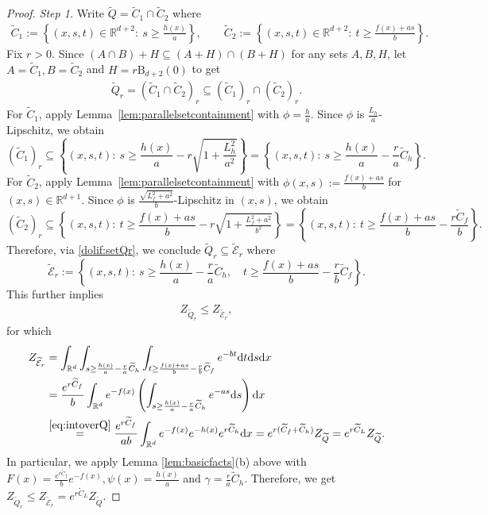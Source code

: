 \documentclass[11pt,letterpaper]{article}
\newcommand{\ball}{\mathrm{B}}
\newcommand{\R}{\mathbb{R}}
\newcommand{\Q}{\widetilde{Q}}
\newcommand{\D}{\mathrm{d}}
\begin{document}
\begin{proof}
\emph{Step 1.}
Write $\Q=\widetilde{C}_1\cap \widetilde{C}_2$ where \begin{align*}
    \widetilde{C}_1:=\left\{(x,s,t)\in\R^{d+2}:\ s\ge \frac{h(x)}a\right\},
\qquad
\widetilde{C}_2:=\left\{(x,s,t)\in\R^{d+2}:\ t\ge \frac{f(x)+as}b\right\}. 
\end{align*}
Fix $r>0$. Since $(A\cap B)+H\subseteq (A+H)\cap(B+H)$ for any sets $A,B,H$, let $A=\widetilde{C}_1,B=\widetilde{C}_2$ and $H=r\ball_{d+2}(0)$ to get
\begin{align}
\label{dolif:setQr}
\Q_r=(\widetilde{C}_1\cap \widetilde{C}_2)_r \subseteq (\widetilde{C}_1)_r\cap (\widetilde{C}_2)_r.
\end{align}
For $\widetilde{C}_1$, apply Lemma~\ref{lem:parallelsetcontainment} with $\phi=\frac{h}{a}$.
Since $\phi$ is $\frac{L_h}{a}$-Lipschitz, we obtain
\[
(\widetilde{C}_1)_r \subseteq \left\{(x,s,t):\ s\ge \frac{h(x)}{a}-r\sqrt{1+\frac{L_h^2}{a^2}}\right\}
=\left\{(x,s,t):\ s\ge \frac{h(x)}{a}-\frac r a \widetilde{C}_h\right\}.
\]
For $\widetilde{C}_2$, apply Lemma~\ref{lem:parallelsetcontainment} with $\phi(x,s):=\frac{f(x)+as}{b}$ for $(x,s)\in \R^{d+1}$. Since $\phi$ is $\frac{\sqrt{L_f^2+a^2}}{b}$-Lipschitz in $(x,s)$, we obtain \[(\widetilde{C}_2)_r \subseteq \left\{(x,s,t):\ t\ge \frac{f(x)+as}{b}-r\sqrt{1+\tfrac{L_f^2+a^2}{b^2}}\right\}
=\left\{(x,s,t):\ t\ge \frac{f(x)+as}{b}-\frac{r\widetilde{C}_f}{b} \right\}.\] 
Therefore, via \eqref{dolif:setQr}, we conclude $\Q_r\subseteq \widetilde{\mathcal{E}}_r$ where \[\widetilde{\mathcal{E}}_r
:=\left\{(x,s,t):\ s\ge \frac{h(x)}{a}-\frac r a \widetilde{C}_h,\quad
t\ge \frac{f(x)+as}{b}-\frac r b \widetilde{C}_f\right\}.\] This further implies
\begin{align}
\label{dolif:firstbound_Zer}
Z_{\Q_r}\le Z_{\widetilde{\mathcal{E}}_r},
\end{align}
for which 
\begin{align*}
Z_{\widetilde{\mathcal{E}}_r}
&=\int_{\R^d}\int_{s\ge \frac{h(x)}{a}-\frac r a \widetilde{C}_h}
\int_{t\ge \frac{f(x)+as}{b}-\frac r b \widetilde{C}_f} e^{-bt}  \D t  \D s  \D x \nonumber\\
&=\frac{e^{r\widetilde{C}_f}}{b}\int_{\R^d} e^{-f(x)}
\left(\int_{s\ge \frac{h(x)}{a}-\frac r a \widetilde{C}_h} e^{-as}  \D s\right)  \D x \nonumber\\
&\stackrel{\eqref{eq:intoverQ}}{=}\frac{e^{r\widetilde{C}_f}}{ab}\int_{\R^d} e^{-f(x)}e^{-h(x)} e^{r\widetilde{C}_h}  \D x
= e^{r(\widetilde{C}_f+\widetilde{C}_h)}  Z_{\Q}
= e^{r\widetilde{C}_L}  Z_{\Q}.
\end{align*}
In particular, we apply Lemma \ref{lem:basicfacts}(b) above with $F(x)=\frac{e^{r\widetilde C_f}}{b} e^{-f(x)},
\psi(x)=\frac{h(x)}{a}$ and $\gamma=\frac{r}{a}\widetilde C_h$. Therefore, we get $Z_{\Q_r}\le Z_{\widetilde{\mathcal{E}}_r}=e^{r\widetilde{C}_L}Z_{\Q}$. 



\end{proof}
\end{document}
